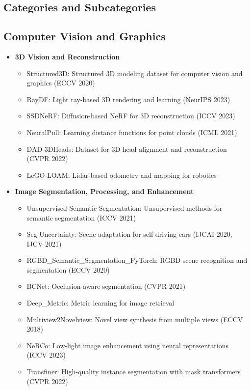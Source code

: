 \subsection{Categories and Subcategories}

\subsection*{Computer Vision and Graphics}
\begin{itemize}
    \item \textbf{3D Vision and Reconstruction}
    \begin{itemize}
        \item Structured3D: Structured 3D modeling dataset for computer vision and graphics (ECCV 2020)
        \item RayDF: Light ray-based 3D rendering and learning (NeurIPS 2023)
        \item SSDNeRF: Diffusion-based NeRF for 3D reconstruction (ICCV 2023)
        \item NeuralPull: Learning distance functions for point clouds (ICML 2021)
        \item DAD-3DHeads: Dataset for 3D head alignment and reconstruction (CVPR 2022)
        \item LeGO-LOAM: Lidar-based odometry and mapping for robotics
    \end{itemize}
    \item \textbf{Image Segmentation, Processing, and Enhancement}
    \begin{itemize}
        \item Unsupervised-Semantic-Segmentation: Unsupervised methods for semantic segmentation (ICCV 2021)
        \item Seg-Uncertainty: Scene adaptation for self-driving cars (IJCAI 2020, IJCV 2021)
        \item RGBD\_Semantic\_Segmentation\_PyTorch: RGBD scene recognition and segmentation (ECCV 2020)
        \item BCNet: Occlusion-aware segmentation (CVPR 2021)
        \item Deep\_Metric: Metric learning for image retrieval
        \item Multiview2Novelview: Novel view synthesis from multiple views (ECCV 2018)
        \item NeRCo: Low-light image enhancement using neural representations (ICCV 2023)
        \item Transfiner: High-quality instance segmentation with mask transformers (CVPR 2022)

\end{itemize}
\end{itemize}
